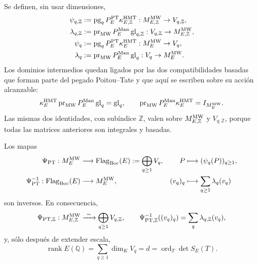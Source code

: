 Se definen, sin usar dimensiones,
\begin{equation}\label{eq:pdf2-bsd-psi-y-lambda-q}
 \begin{aligned}
  \psi_{q,\mathbb Z}&:=
      \operatorname{pg}_qP_E^{\rm PT}\kappa_{E,\mathbb Z}^{\rm HMT}:
      M_{E,\mathbb Z}^{\rm MW}\to V_{q,\mathbb Z},\\
  \lambda_{q,\mathbb Z}&:=
      \operatorname{pr}_{\rm MW}P_E^{\rm Man}
      \operatorname{gl}_{q,\mathbb Z}:
      V_{q,\mathbb Z}\to M_{E,\mathbb Z}^{\rm MW},\\
  \psi_q&:=\operatorname{pg}_qP_E^{\rm PT}\kappa_E^{\rm HMT}:
      M_E^{\rm MW}\to V_q,\\
  \lambda_q&:=\operatorname{pr}_{\rm MW}P_E^{\rm Man}
      \operatorname{gl}_q:V_q\to M_E^{\rm MW}.
 \end{aligned}
\end{equation}
Los dominios intermedios quedan ligados por las dos compatibilidades basadas
que forman parte del pegado Poitou--Tate y que aquí se escriben sobre su
acción alcanzable:
\begin{equation}\label{eq:pdf2-bsd-kummer-glue-compatibilidad}
 \kappa_E^{\rm HMT}\operatorname{pr}_{\rm MW}P_E^{\rm Man}
       \operatorname{gl}_q=\operatorname{gl}_q,
 \qquad
 \operatorname{pr}_{\rm MW}P_E^{\rm Man}\kappa_E^{\rm HMT}
       =I_{M_E^{\rm MW}}.
\end{equation}
Las mismas dos identidades, con subíndice $\mathbb Z$, valen sobre
$M_{E,\mathbb Z}^{\rm MW}$ y $V_{q,\mathbb Z}$, porque todas las matrices
anteriores son integrales y basadas.

\begin{theorem}
\label{thm:pdf2-bsd-psi-pt}
Los mapas
\begin{equation}\label{eq:pdf2-bsd-psi-pt}
 \begin{aligned}
 \Psi_{\rm PT}:M_E^{\rm MW}&\longrightarrow
       \operatorname{Flag}_{\rm Boc}(E):=\bigoplus_{q\ge1}V_q,
 &P&\longmapsto(\psi_q(P))_{q\ge1},\\
 \Psi_{\rm PT}^{-1}:\operatorname{Flag}_{\rm Boc}(E)&\longrightarrow M_E^{\rm MW},
 &(v_q)_q&\longmapsto\sum_{q\ge1}\lambda_q(v_q)
 \end{aligned}
\end{equation}
son inversos. En consecuencia,
\begin{equation}\label{eq:pdf2-bsd-psi-pt-integral}
 \Psi_{{\rm PT},\mathbb Z}:M_{E,\mathbb Z}^{\rm MW}
 \xrightarrow{\ \sim\ }\bigoplus_{q\ge1}V_{q,\mathbb Z},
 \qquad
 \Psi_{{\rm PT},\mathbb Z}^{-1}((v_q)_q)=
 \sum_q\lambda_{q,\mathbb Z}(v_q),
\end{equation}
y, sólo después de extender escala,
\begin{equation}\label{eq:pdf2-bsd-rango-orden}
 \operatorname{rank}E(\mathbb Q)
 =\sum_{q\ge1}\dim_K V_q
 =d=\operatorname{ord}_T\det S_E(T).
\end{equation}
\end{theorem}

